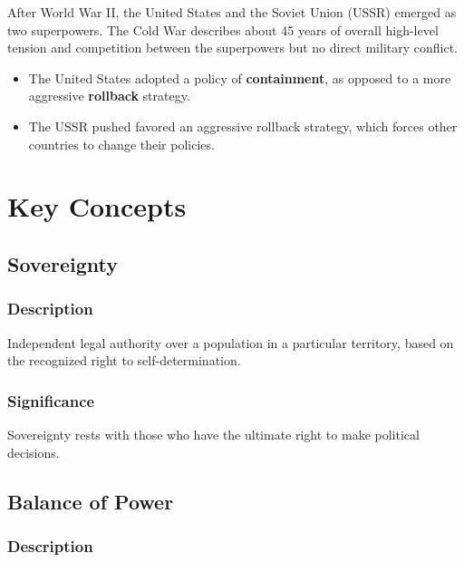 \documentclass[
]{book}
\begin{document}
After World War II, the United States and the Soviet Union (USSR) emerged as two superpowers. The Cold War describes about 45 years of overall high-level tension and competition between the superpowers but no direct military conflict.

\begin{itemize}
\item
  The United States adopted a policy of \textbf{containment}, as opposed to a more aggressive \textbf{rollback} strategy.
\item
  The USSR pushed favored an aggressive rollback strategy, which forces other countries to change their policies.
\end{itemize}

\hypertarget{key-concepts}{%
\section{Key Concepts}\label{key-concepts}}

\hypertarget{sovereignty}{%
\subsection{Sovereignty}\label{sovereignty}}

\hypertarget{description-4}{%
\subsubsection{Description}\label{description-4}}

Independent legal authority over a population in a particular territory, based on the recognized right to self-determination.

\hypertarget{significance-4}{%
\subsubsection{Significance}\label{significance-4}}

Sovereignty rests with those who have the ultimate right to make political decisions.

\hypertarget{balance-of-power}{%
\subsection{Balance of Power}\label{balance-of-power}}

\hypertarget{description-5}{%
\subsubsection{Description}\label{description-5}}
\end{document}
